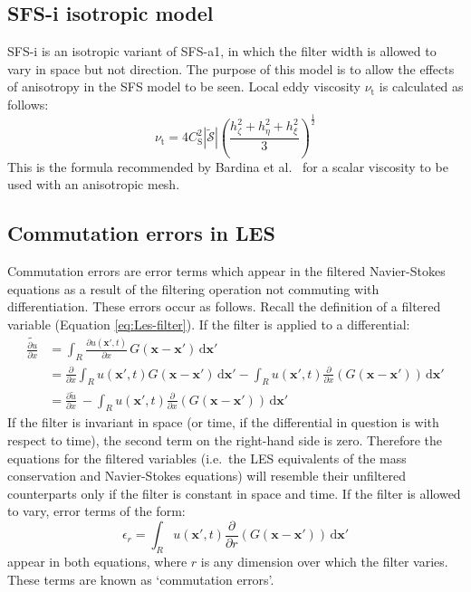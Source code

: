 \subsection{SFS-i isotropic model}
SFS-i is an isotropic variant of SFS-a1, in which the filter width
is allowed to vary in space but not direction. The purpose of this
model is to allow the effects of anisotropy in the SFS model to be
seen. Local eddy viscosity $\nu_{\textrm{t}}$ is calculated as
follows:
\begin{equation}
\nu_{\textrm{t}} = 4 C_{\textrm{S}}^2 |\tilde{\mathcal{S}}|
\left(\frac{h_{\zeta}^2+h_{\eta}^2+h_\xi^2}{3}\right)^\frac{1}{2}
\end{equation}
This is the formula recommended by Bardina et al.~\cite{BFR80} for
a scalar viscosity to be used with an anisotropic mesh.

\subsection{Commutation errors in LES}
Commutation errors are error terms which appear in the filtered
Navier-Stokes equations as a result of the filtering operation not
commuting with differentiation. These errors occur as follows.
Recall the definition of a filtered variable (Equation
\ref{eq:Les-filter}). If the filter is applied to a differential:
\begin{align}
\widetilde{\frac{\partial u}{\partial x}}&= \int_{R}
\frac{\partial u(\mathbf{x}',t)}{\partial x}
\,G(\mathbf{x}-\mathbf{x}')\,\mathrm{d}\mathbf{x}'\nonumber\\
&=\frac{\partial}{\partial x}\int_{R}u(\mathbf{x}',t)
G(\mathbf{x}-\mathbf{x}')\,\mathrm{d}\mathbf{x}' -\int_{R}
u(\mathbf{x}',t)\frac{\partial}{\partial x}
\left(G(\mathbf{x}-\mathbf{x}')\right)\,\mathrm{d}\mathbf{x}'\nonumber\\
&=\frac{\partial \tilde{u}}{\partial x}\:- \int_{R}
u(\mathbf{x}',t)\frac{\partial}{\partial x}
\left(G(\mathbf{x}-\mathbf{x}')\right)\,\mathrm{d}\mathbf{x}'
\end{align}
If the filter is invariant in space (or time, if the differential
in question is with respect to time), the second term on the
right-hand side is zero. Therefore the equations for the filtered
variables (i.e.~the LES equivalents of the mass conservation and
Navier-Stokes equations) will resemble their unfiltered
counterparts only if the filter is constant in space and time. If
the filter is allowed to vary, error terms of the form:
\begin{equation}
\epsilon_r= \int_{R} u(\mathbf{x}',t)\frac{\partial}{\partial r}
\left(G(\mathbf{x}-\mathbf{x}')\right)\,\mathrm{d}\mathbf{x}'
\label{eq:Error-term}
\end{equation}
appear in both equations, where $r$ is any dimension over which
the filter varies. These terms are known as `commutation errors'.

